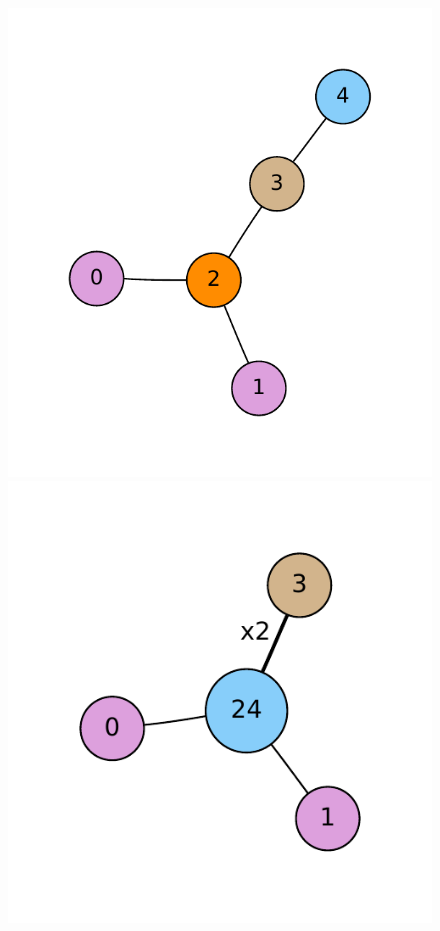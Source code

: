 \begin{figure}[ht]
  \begin{center}
    \includegraphics[width=\figurewidthTRIPLE]{pictures/graph_examples/example_simple_graph2.pdf}
    \includegraphics[width=\figurewidthTRIPLE]{pictures/graph_examples/example_simple_graph3.pdf}

\end{center}
\end{figure}
